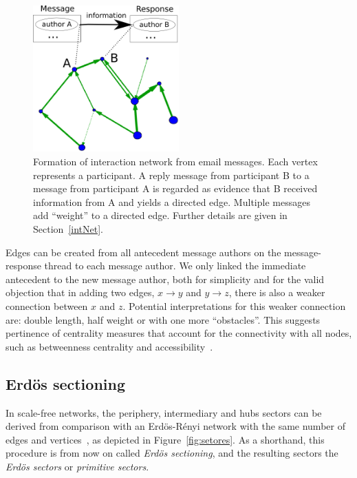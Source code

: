 \documentclass[%
 aip,
 jmp,%
 amsmath,amssymb,
 reprint,%
]{revtex4-1}
\begin{document}
\begin{figure}[!h]
    \centering
    \includegraphics[width=0.5\textwidth]{figs/criaRede_}
    \caption{Formation of interaction network from email messages. Each vertex represents a participant. A reply message from participant B to a message from participant A is regarded as evidence that B received information from A and yields a directed edge. Multiple messages add ``weight'' to a directed edge. Further details are given in Section~\ref{intNet}.}
    \label{formationNetwork}
\end{figure}


Edges can be created from all antecedent message authors on the message-response thread to each message author.
We only linked the immediate antecedent to the new message author, both for simplicity and for the valid objection that in adding two edges, $x\rightarrow y$ and $y\rightarrow z$, there is also a weaker connection between $x$ and $z$. Potential interpretations for this weaker connection are: double length, half weight or with one more ``obstacles''. This suggests pertinence of centrality measures that account for the connectivity with all nodes, such as betweenness centrality and accessibility~\cite{luMeasures,access}.

\subsection{Erd\"os sectioning}\label{sectioning}
In scale-free networks, the periphery, intermediary and hubs sectors can be derived from comparison with an Erd\"os-R\'enyi network with the same number of edges and vertices~\cite{3setores}, as depicted in Figure~\ref{fig:setores}. As a shorthand, this procedure is from now on called \emph{Erd\"os sectioning}, and the resulting sectors the \emph{Erd\"os sectors} or \emph{primitive sectors}.
\end{document}
